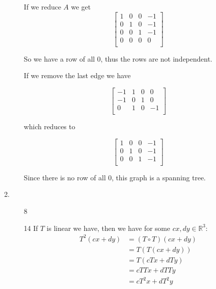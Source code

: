 \documentclass[12pt,letterpaper]{article}
\begin{document}
\begin{enumerate}[label=\S 2.\arabic*]
\begin{enumerate}
          If we reduce $A$ we get
          \[
            \begin{bmatrix}
               1 &  0 &  0 & -1 \\
               0 &  1 &  0 & -1 \\
               0 &  0 &  1 & -1 \\
               0 &  0 &  0 &  0 \\
            \end{bmatrix}
          \]

          So we have a row of all 0, thus the rows are not independent.

          If we remove the last edge we have

          \[
            \begin{bmatrix}
              -1 &  1 &  0 &  0 \\
              -1 &  0 &  1 &  0 \\
               0 &  1 &  0 & -1 \\
            \end{bmatrix}
          \]

          which reduces to

          \[
            \begin{bmatrix}
               1 &  0 &  0 & -1 \\
               0 &  1 &  0 & -1 \\
               0 &  0 &  1 & -1 \\
            \end{bmatrix}
          \]

          Since there is no row of all 0, this graph is a spanning tree.
      \end{enumerate}
    \item
      \begin{enumerate}
        \item [8]
        \item [14]
          If $T$ is linear we have, then we have for some $cx, dy \in \mathbb{R}^3$:
          \begin{align*}
            T^2(cx + dy)
            &= \left(T \circ T\right)(cx + dy) \\
            &= T(T(cx + dy)) \\
            &= T(cTx + dTy) \\
            &= cTTx + dTTy \\
            &= cT^2x + dT^2y \\
          \end{align*}


\end{enumerate}
\end{enumerate}
\end{document}
